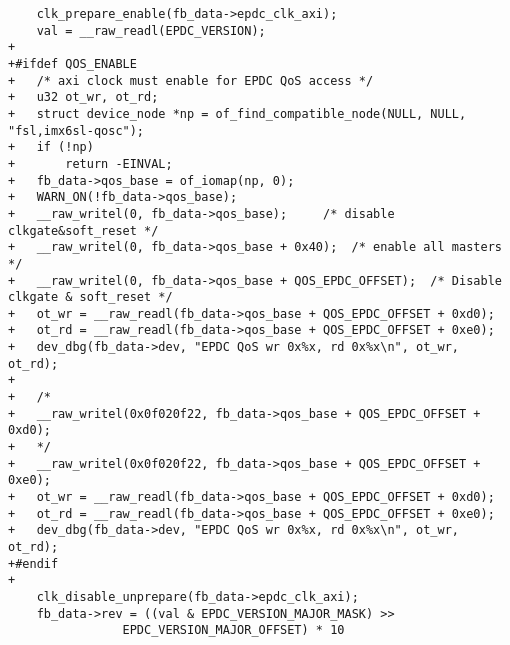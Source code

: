 \documentclass{memoir}
\begin{document}
\begin{verbatim}
 	clk_prepare_enable(fb_data->epdc_clk_axi);
 	val = __raw_readl(EPDC_VERSION);
+
+#ifdef QOS_ENABLE
+	/* axi clock must enable for EPDC QoS access */
+	u32 ot_wr, ot_rd;
+	struct device_node *np = of_find_compatible_node(NULL, NULL, "fsl,imx6sl-qosc");
+	if (!np)
+		return -EINVAL;
+	fb_data->qos_base = of_iomap(np, 0);
+	WARN_ON(!fb_data->qos_base);
+	__raw_writel(0, fb_data->qos_base);		/* disable clkgate&soft_reset */
+	__raw_writel(0, fb_data->qos_base + 0x40);	/* enable all masters */
+	__raw_writel(0, fb_data->qos_base + QOS_EPDC_OFFSET);  /* Disable clkgate & soft_reset */
+	ot_wr = __raw_readl(fb_data->qos_base + QOS_EPDC_OFFSET + 0xd0);
+	ot_rd = __raw_readl(fb_data->qos_base + QOS_EPDC_OFFSET + 0xe0);
+	dev_dbg(fb_data->dev, "EPDC QoS wr 0x%x, rd 0x%x\n", ot_wr, ot_rd);
+
+	/*
+	__raw_writel(0x0f020f22, fb_data->qos_base + QOS_EPDC_OFFSET + 0xd0);
+	*/
+	__raw_writel(0x0f020f22, fb_data->qos_base + QOS_EPDC_OFFSET + 0xe0);
+	ot_wr = __raw_readl(fb_data->qos_base + QOS_EPDC_OFFSET + 0xd0);
+	ot_rd = __raw_readl(fb_data->qos_base + QOS_EPDC_OFFSET + 0xe0);
+	dev_dbg(fb_data->dev, "EPDC QoS wr 0x%x, rd 0x%x\n", ot_wr, ot_rd);
+#endif
+
 	clk_disable_unprepare(fb_data->epdc_clk_axi);
 	fb_data->rev = ((val & EPDC_VERSION_MAJOR_MASK) >>
 				EPDC_VERSION_MAJOR_OFFSET) * 10
\end{verbatim}
\end{document}
